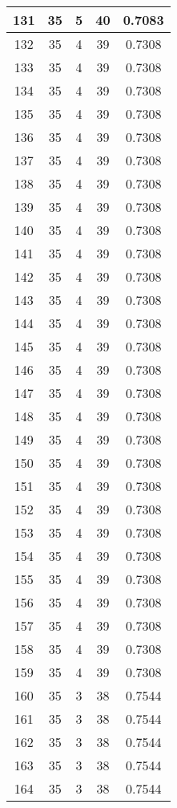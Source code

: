 \documentclass[letterpaper, 12pt]{article}
\begin{document}
\begin{longtable}{|c|c|c|c|c|}
\hline
131 & 35 & 5 & 40 & 0.7083 \\
\hline
132 & 35 & 4 & 39 & 0.7308 \\
\hline
133 & 35 & 4 & 39 & 0.7308 \\
\hline
134 & 35 & 4 & 39 & 0.7308 \\
\hline
135 & 35 & 4 & 39 & 0.7308 \\
\hline
136 & 35 & 4 & 39 & 0.7308 \\
\hline
137 & 35 & 4 & 39 & 0.7308 \\
\hline
138 & 35 & 4 & 39 & 0.7308 \\
\hline
139 & 35 & 4 & 39 & 0.7308 \\
\hline
140 & 35 & 4 & 39 & 0.7308 \\
\hline
141 & 35 & 4 & 39 & 0.7308 \\
\hline
142 & 35 & 4 & 39 & 0.7308 \\
\hline
143 & 35 & 4 & 39 & 0.7308 \\
\hline
144 & 35 & 4 & 39 & 0.7308 \\
\hline
145 & 35 & 4 & 39 & 0.7308 \\
\hline
146 & 35 & 4 & 39 & 0.7308 \\
\hline
147 & 35 & 4 & 39 & 0.7308 \\
\hline
148 & 35 & 4 & 39 & 0.7308 \\
\hline
149 & 35 & 4 & 39 & 0.7308 \\
\hline
150 & 35 & 4 & 39 & 0.7308 \\
\hline
151 & 35 & 4 & 39 & 0.7308 \\
\hline
152 & 35 & 4 & 39 & 0.7308 \\
\hline
153 & 35 & 4 & 39 & 0.7308 \\
\hline
154 & 35 & 4 & 39 & 0.7308 \\
\hline
155 & 35 & 4 & 39 & 0.7308 \\
\hline
156 & 35 & 4 & 39 & 0.7308 \\
\hline
157 & 35 & 4 & 39 & 0.7308 \\
\hline
158 & 35 & 4 & 39 & 0.7308 \\
\hline
159 & 35 & 4 & 39 & 0.7308 \\
\hline
160 & 35 & 3 & 38 & 0.7544 \\
\hline
161 & 35 & 3 & 38 & 0.7544 \\
\hline
162 & 35 & 3 & 38 & 0.7544 \\
\hline
163 & 35 & 3 & 38 & 0.7544 \\
\hline
164 & 35 & 3 & 38 & 0.7544 \\

\end{longtable}
\end{document}
